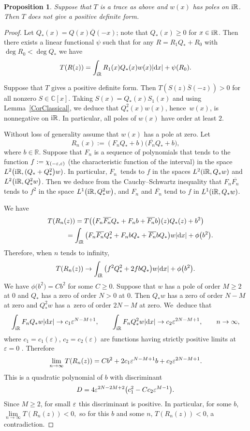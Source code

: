 \documentclass[10pt,a4paper]{amsart}
\newcommand{\RN}{\mathbb{R}} %
\newcommand{\CN}{\mathbb{C}} %
\newcommand{\eps}{\ensuremath\varepsilon}
\newcommand{\ovl}{\overline}
\newtheorem{Proposition}[Theorem]{Proposition}
\theoremstyle{definition}
\numberwithin{equation}{section}
\begin{document}
\begin{Proposition}
\label{PropPositiveFormNoPoles}
Suppose that $T$ is a trace as above and $w(x)$ has poles on ${\rm i}\RN$. Then $T$ does not give a positive definite form.
\end{Proposition}
\begin{proof}
Let $Q_*(x)=Q(x)\ovl{Q}(-x)$; note that $Q_*(x)\ge 0$ for $x\in {\rm i}\mathbb R$. Then there exists a linear functional $\psi$ such that for any $R=R_1Q_*+R_0$ with $\deg R_0<\deg Q_*$ we have
\[
T(R(z))=\int_{{\rm i}\RN}R_1(x)Q_*(x)w(x)|{\rm d}x|+\psi(R_0).
\]

Suppose that $T$ gives a positive definite form. Then $T(S(z)\ovl{S}(-z))>0$ for all nonzero \mbox{$S\in\CN[x]$}. Taking $S(x)=Q_*(x)S_1(x)$ and using Lemma~\ref{CorClassical}, we deduce that $Q_*^2(x)w(x)$, hence~$w(x)$, is nonnegative on ${\rm i}\RN$. In particular, all poles of $w(x)$ have order at least $2$.

Without loss of generality assume that $w(x)$ has a pole at zero. Let
\[
R_n(x):=(F_nQ_*+b)\big(\ovl{F_n}Q_*+b\big),
\]
where $b\in \RN$. Suppose that $F_n$ is a sequence of polynomials that tends to the function $f:=\chi_{(-\eps,\eps)}$ (the characteristic function of the interval) in the space $L^{2}\big({\rm i}\RN, (Q_*+Q_*^2\big)w)$. In particular, $F_n$~tends to $f$ in the spaces $L^2({\rm i}\RN,Q_* w)$ and $L^2\big({\rm i}\RN,Q_*^2 w\big)$. Then we deduce from the Cauchy--Schwartz inequality that $F_n\ovl{F_n}$ tends to $f^2$ in the space $L^1\big({\rm i}\RN,Q_*^2w\big)$, and $F_n$ and $\ovl{F_n}$ tend to $f$ in $L^1({\rm i}\RN,Q_*w)$.

We have
\begin{gather*}
T(R_n(z))=T\big(\big(F_n\ovl{F_n}Q_*+F_nb+\ovl{F_n}b\big)(z)Q_*(z)+b^2\big)
\\ \hphantom{T(R_n(z))}
{}=\int_{{\rm i}\RN}\big(F_n\ovl{F_n}Q_*^2+F_nbQ_*+\ovl{F_n}bQ_*\big)w|{\rm d}x|+\phi\big(b^2\big).
\end{gather*}
Therefore, when $n$ tends to infinity,
\[
T(R_n(z))\to \int_{{\rm i}\RN}\big(f^2Q_*^2+2fbQ_*\big)w|{\rm d}x|+\phi\big(b^2\big).
\]
We have $\phi\big(b^2\big)=Cb^2$ for some $C\geq 0$. Suppose that $w$ has a pole of order $M\geq 2$ at $0$ and $Q_*$ has a zero of order $N>0$ at $0$. Then $Q_*w$ has a zero of order $N-M$ at zero and $Q_*^2w$ has a~zero of order $2N-M$ at zero. We~deduce that
\[
\int_{{\rm i}\RN}F_nQ_*w|{\rm d}x|\to c_1\eps^{N-M+1},\qquad \int_{{\rm i}\RN}F_nQ_*^2w|{\rm d}x|\to c_2\eps^{2N-M+1},\qquad n\to \infty,
\]
 where $c_1=c_1(\varepsilon)$, $c_2=c_2(\varepsilon)$ are functions having strictly positive limits at $\varepsilon=0$ . Therefore
 \[
 \lim_{n\to\infty}T(R_n(z))=Cb^2+2c_1\eps^{N-M+1}b+c_2\eps^{2N-M+1}.
 \]
 This is a quadratic polynomial of $b$ with discriminant
 \[
 D=4\eps^{2N-2M+2}\big(c_1^2-Cc_2\eps^{M-1}\big).
 \]
 Since $M{\geq }2$, for small $\eps$ this discriminant is positive. In particular, for some $b$,
 $ \lim\limits_{n\to\infty}T(R_n(z)){<}0,$
 so for this $b$ and some $n$, $T(R_n(z))<0$, a contradiction.
\end{proof}
\end{document}
